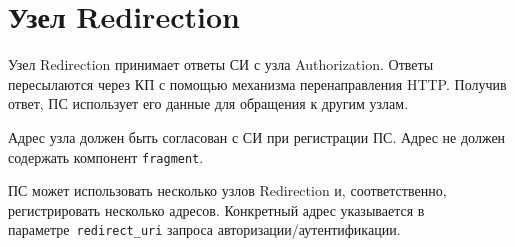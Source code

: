 \section{Узел Redirection}\label{OIDC.Redicrection}

Узел Redirection принимает ответы СИ с узла Authorization.
Ответы пересылаются через КП с помощью механизма перенаправления HTTP. 
Получив ответ, ПС использует его данные для обращения к другим узлам.

Адрес узла должен быть согласован с СИ при регистрации ПС.
%
%
Адрес не должен содержать компонент \lstinline{fragment}.

ПС может использовать несколько узлов Redirection и, соответственно,
регистрировать несколько адресов. Конкретный адрес указывается в 
параметре~\lstinline{redirect_uri} запроса авторизации/аутентификации.

